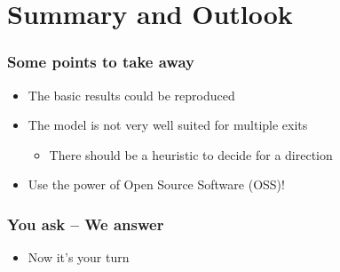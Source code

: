 \documentclass{beamer}
\begin{document}
\section{Summary and Outlook}
\begin{frame}
	\frametitle{Some points to take away}
	\begin{itemize}
		\item The basic results could be reproduced
		\item The model is not very well suited for multiple exits
		\begin{itemize}
			\item There should be a heuristic to decide for a direction
		\end{itemize}
		\item Use the power of Open Source Software (OSS)!
	\end{itemize}
\end{frame}

\begin{frame}
	\frametitle{You ask -- We answer}
	\begin{itemize}
		\item Now it's your turn
	\end{itemize}
\end{frame}
\end{document}
